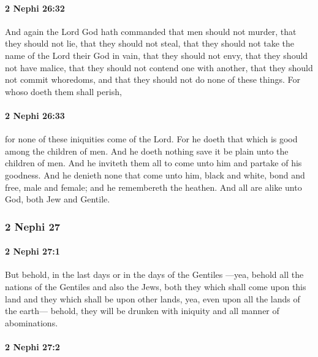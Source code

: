 		\paragraph{2 Nephi 26:32} %
			\label{2NEPHI-26-32}

			And again the Lord God hath commanded
			that men should not murder,
			that they should not lie,
			that they should not steal,
			that they should not take the name of the Lord their God in vain,
			that they should not envy,
			that they should not have malice,
			that they should not contend one with another,
			that they should not commit whoredoms,
			and that they should not do none of these things.
			For whoso doeth them shall perish,

		\paragraph{2 Nephi 26:33} %
			\label{2NEPHI-26-33}

			for none of these iniquities come of the Lord.
			For he doeth that which is good among the children of men.
			And he doeth nothing save it be plain unto the children of men.
			And he inviteth them all to come unto him and partake of his goodness.
			And he denieth none that come unto him,
			black and white, bond and free, male and female;
			and he remembereth the heathen.
			And all are alike unto God, both Jew and Gentile.

	\subsubsection{2 Nephi 27} %
		\label{2NEPHI-27}
		
		\paragraph{2 Nephi 27:1} %
			\label{2NEPHI-27-1}

			But behold, in the last days or in the days of the Gentiles
			---yea, behold all the nations of the Gentiles and also the Jews,
			both they which shall come upon this land
			and they which shall be upon other lands,
			yea, even upon all the lands of the earth---
			behold, they will be drunken with iniquity and all manner of abominations.

		\paragraph{2 Nephi 27:2} %
			\label{2NEPHI-27-2}

